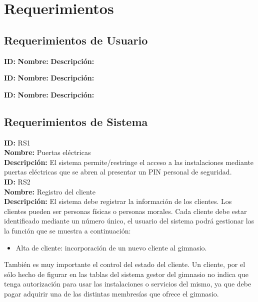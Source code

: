 \chapter*{Requerimientos}\label{cap.requerimientos}


\section{Requerimientos de Usuario}

\textbf{ID: }
\textbf{Nombre: }
\textbf{Descripci\'on: }

\textbf{ID: }
\textbf{Nombre: }
\textbf{Descripci\'on: }

\textbf{ID: }
\textbf{Nombre: }
\textbf{Descripci\'on: }

\section{Requerimientos de Sistema}
\textbf{ID: } RS1 \\
\textbf{Nombre:} Puertas eléctricas \\
\textbf{Descripción:} El sistema permite/restringe el acceso a las instalaciones mediante puertas eléctricas que se abren al presentar un PIN personal de seguridad.\\

\textbf{ID: } RS2\\
\textbf{Nombre: }Registro del cliente\\
\textbf{Descripción:} El sistema debe registrar la información de los clientes. Los clientes pueden ser personas físicas o personas morales. Cada cliente debe estar identificado mediante un número único, el usuario del sistema podrá gestionar las la función que se muestra a continuación:\\
	\begin{itemize} 
		\item Alta de cliente: incorporación de un nuevo cliente al gimnasio.
	\end{itemize}
También es muy importante el control del estado del cliente. Un cliente, por el sólo hecho de figurar en las tablas del sistema gestor del gimnasio no indica que tenga autorización para usar las instalaciones o servicios del mismo, ya que debe pagar adquirir una de las distintas membresías que ofrece el gimnasio.\\

